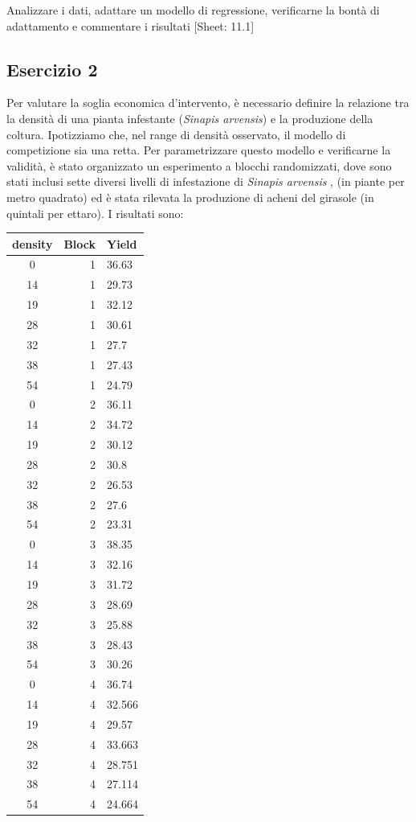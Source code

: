 \documentclass[a4paper,12pt,oneside]{book}
\begin{document}
Analizzare i dati, adattare un modello di regressione, verificarne la bontà di adattamento e commentare i risultati
{[}Sheet: 11.1{]}

\hypertarget{esercizio-2-7}{%
\subsection{Esercizio 2}\label{esercizio-2-7}}

Per valutare la soglia economica d'intervento, è necessario definire la relazione tra la densità di una pianta infestante (\emph{Sinapis arvensis}) e la produzione della coltura. Ipotizziamo che, nel range di densità osservato, il modello di competizione sia una retta. Per parametrizzare questo modello e verificarne la validità, è stato organizzato un esperimento a blocchi randomizzati, dove sono stati inclusi sette diversi livelli di infestazione di \emph{Sinapis arvensis} , (in piante per metro quadrato) ed è stata rilevata la produzione di acheni del girasole (in quintali per ettaro). I risultati sono:

\begin{longtable}[]{@{}crl@{}}
\toprule
density & Block & Yield \\
\midrule
\endhead
0 & 1 & 36.63 \\
14 & 1 & 29.73 \\
19 & 1 & 32.12 \\
28 & 1 & 30.61 \\
32 & 1 & 27.7 \\
38 & 1 & 27.43 \\
54 & 1 & 24.79 \\
0 & 2 & 36.11 \\
14 & 2 & 34.72 \\
19 & 2 & 30.12 \\
28 & 2 & 30.8 \\
32 & 2 & 26.53 \\
38 & 2 & 27.6 \\
54 & 2 & 23.31 \\
0 & 3 & 38.35 \\
14 & 3 & 32.16 \\
19 & 3 & 31.72 \\
28 & 3 & 28.69 \\
32 & 3 & 25.88 \\
38 & 3 & 28.43 \\
54 & 3 & 30.26 \\
0 & 4 & 36.74 \\
14 & 4 & 32.566 \\
19 & 4 & 29.57 \\
28 & 4 & 33.663 \\
32 & 4 & 28.751 \\
38 & 4 & 27.114 \\
54 & 4 & 24.664 \\
\bottomrule
\end{longtable}
\end{document}
